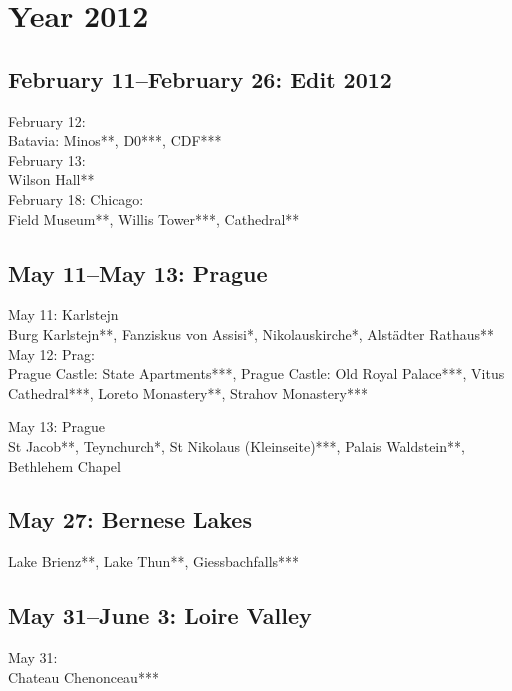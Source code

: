 \chapter{Year 2012}
\label{2012}

\section{February 11--February 26: Edit 2012}
\label{2012:EDIT}

February 12:\\
Batavia: Minos**, D0***, CDF***\\

February 13:\\
Wilson Hall**\\

February 18: Chicago:\\
Field Museum**, Willis Tower***, Cathedral**

\section{May 11--May 13: Prague}
\label{2012Prag}

May 11: Karlstejn\\
Burg Karlstejn**, Fanziskus von Assisi*, Nikolauskirche*, Alst\"adter Rathaus**\\

May 12: Prag:\\
Prague Castle: State Apartments***, Prague Castle: Old Royal Palace***, Vitus Cathedral***, Loreto Monastery**, Strahov Monastery***

May 13: Prague\\
St Jacob**, Teynchurch*, St Nikolaus (Kleinseite)***, Palais Waldstein**, Bethlehem Chapel

\section{May 27: Bernese Lakes}
\label{Brienz2012}

Lake Brienz**, Lake Thun**, Giessbachfalls***

\section{May 31--June 3: Loire Valley}
\label{2012Loire}

May 31:\\
Chateau Chenonceau***\\

